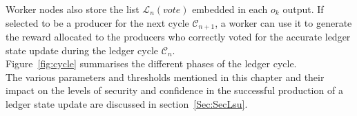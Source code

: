 \documentclass{article}
\begin{document}
Worker nodes also store the list $\mathcal{L}_{n}(vote)$ embedded in each $o_k$ output. If selected to be a producer for the next cycle $\mathcal{C}_{n+1}$, a worker can use it to generate the reward allocated to the producers who correctly voted for the accurate ledger state update during the ledger cycle $\mathcal{C}_{n}$.\\

Figure~\ref{fig:cycle} summarises the different phases of the ledger cycle.\\

The various parameters and thresholds mentioned in this chapter and their impact on the levels of security and confidence in the successful production of a ledger state update are discussed in section~\ref{Sec:SecLsu}.





\end{document}
